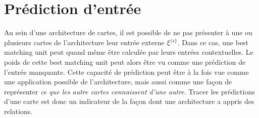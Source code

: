 \section{Prédiction d'entrée}

Au sein d'une architecture de cartes, il est possible de ne pas présenter à une ou plusieurs cartes de l'architecture leur entrée externe $\xi^{({i})}$. Dans ce cas, une best matching unit peut quand même être calculée par leurs entrées contextuelles. Le poids de cette best matching unit peut alors être vu comme une prédiction de l'entrée manquante. Cette capacité de prédiction peut être à la fois vue comme une application possible de l'architecture, mais aussi comme une façon de représenter \emph{ce que les autre cartes connaissent d'une autre}. Tracer les prédictions d'une carte est donc un indicateur de la façon dont une architecture a appris des relations. 